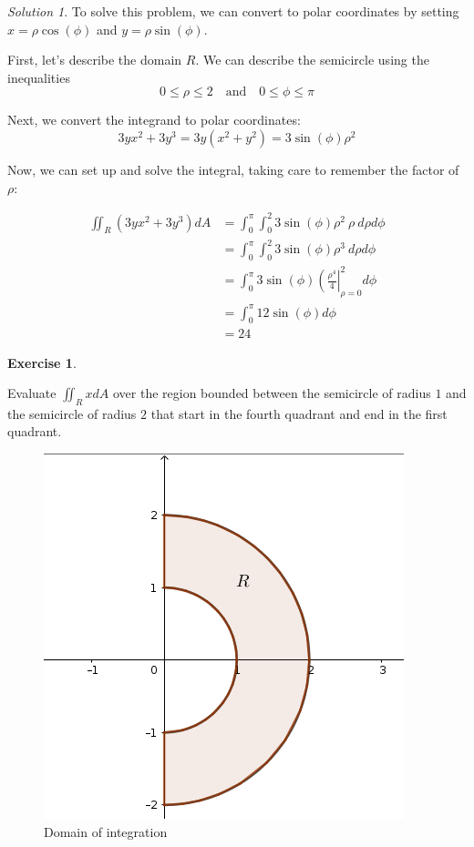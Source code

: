 \documentclass[
]{book}
\theoremstyle{definition}
\theoremstyle{definition}
\theoremstyle{definition}
\newtheorem{exercise}{Exercise}[chapter]
\theoremstyle{definition}
\theoremstyle{remark}
\newtheorem*{solution}{Solution}
\begin{document}
\begin{solution}

To solve this problem, we can convert to polar coordinates by setting \(x=\rho\cos(\phi)\) and \(y=\rho\sin(\phi)\).

First, let's describe the domain \(R\). We can describe the semicircle using the inequalities \[0\leq \rho\leq 2 \quad\mbox{and}\quad 0\leq \phi\leq \pi\]

Next, we convert the integrand to polar coordinates: \[3yx^2+3y^3 = 3y(x^2+y^2) = 3\sin(\phi)\rho^2\]

Now, we can set up and solve the integral, taking care to remember the factor of \(\rho\):

\begin{align*}
\displaystyle \iint_R (3yx^2+3y^3)dA &= \int_{0}^{\pi}\int_0^2 3\sin(\phi)\rho^2~\rho~d\rho d\phi \\
&= \int_{0}^{\pi}\int_0^2 3\sin(\phi)\rho^3~d\rho d\phi \\
&= \int_0^{\pi}3\sin(\phi)\left (\frac{\rho^4}{4} \right|_{\rho=0}^2 d\phi\\
&= \int_0^{\pi}12\sin(\phi)d\phi\\
&= 24
\end{align*}

\end{solution}

\begin{exercise}
\protect\hypertarget{exr:unlabeled-div-93}{}\label{exr:unlabeled-div-93}

Evaluate \(\displaystyle \iint_R x dA\) over the region bounded between the semicircle of radius \(1\) and the semicircle of radius \(2\) that start in the fourth quadrant and end in the first quadrant.

\begin{figure}

{\centering \includegraphics[width=0.3\linewidth]{images/lec-12-ex-2} 

}

\caption{Domain of integration}\label{fig:unnamed-chunk-27}
\end{figure}

\end{exercise}
\end{document}
